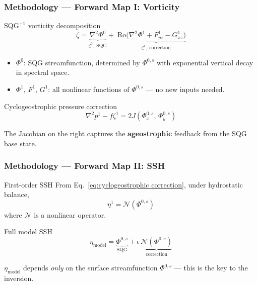 \documentclass[
	11pt, %
]{beamer}
\newcommand{\SQGp}{$\text{SQG}^{+1}$}
\begin{document}
\begin{frame}
    \frametitle{Methodology --- Forward Map I: Vorticity}
    \begin{block}{\SQGp{} vorticity decomposition}
        \vspace{-0.5em}
        \begin{equation}
            \zeta = \underbrace{\nabla^2 \Phi^0}_{\zeta^0,\;\text{SQG}} +\; \mathrm{Ro}\underbrace{\bigl(\nabla^2 \Phi^1 + F_{yz}^1 - G_{xz}^1\bigr)}_{\zeta^1,\;\text{correction}}
        \end{equation}
    \end{block}
    \begin{itemize}
        \item $\Phi^0$: SQG streamfunction, determined by $\Phi^{0,s}$ with exponential vertical decay in spectral space.
        \item $\Phi^1,\,F^1,\,G^1$: all nonlinear functions of $\Phi^{0,s}$ --- no new inputs needed.
    \end{itemize}
    \begin{block}{Cyclogeostrophic pressure correction \label{eq:cyclogeostrophic correction}}
        \vspace{-0.5em}
        \begin{equation}
            \nabla^2 p^1 - f\zeta^1 = 2J(\Phi_x^{0,s},\, \Phi_y^{0,s})
            \label{eq:cyclogeostrophic correction}
        \end{equation}
    \end{block}
    The Jacobian on the right captures the \textbf{ageostrophic} feedback from the SQG base state.
\end{frame}


\begin{frame}
    \frametitle{Methodology --- Forward Map II: SSH}
    \begin{block}{First-order SSH}
        From Eq.~\eqref{eq:cyclogeostrophic correction}, under hydrostatic balance,
        \begin{equation}
            \eta^1 = \mathcal{N}(\Phi^{0,s})
        \end{equation}
        where $\mathcal{N}$ is a nonlinear operator.
    \end{block}
    \begin{block}{Full model SSH}
        \begin{equation}
            \eta_{\mathrm{model}} = \underbrace{\Phi^{0,s}}_{\text{SQG}} + \epsilon\,\underbrace{\mathcal{N}(\Phi^{0,s})}_{\text{correction}}
        \end{equation}
    \end{block}
    \vspace{0.5em}
    $\eta_{\mathrm{model}}$ depends \emph{only} on the surface streamfunction $\Phi^{0,s}$ --- this is the key to the inversion.
\end{frame}
\end{document}
